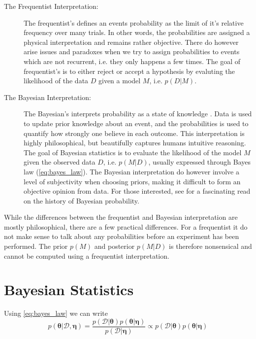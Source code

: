 \begin{description}
    \item[The Frequentist Interpretation:] The frequentist's defines an events probability as the limit of it's relative frequency over many trials. In other words, the probabilities are assigned a physical interpretation and remains rather objective. There do however arise issues and paradoxes when we try to assign probabilities to events which are not recurrent, i.e. they only happens a few times. The goal of frequentist's is to either reject or accept a hypothesis by evaluting the likelihood of the data $D$ given a model $M$, i.e. $p(D | M)$. 
    \item[The Bayesian Interpretation:] The Bayesian's interprets probability as a state of knowledge \cite{Jaynes86bayesianmethods:}. Data is used to update prior knowledge about an event, and the probabilities is used to quantify how strongly one believe in each outcome. This interpretation is highly philosophical, but beautifully captures humans intuitive reasoning. The goal of Bayesian statistics is to evaluate the likelihood of the model $M$ given the observed data $D$, i.e. $p(M | D)$, usually expressed through Bayes law (\cref{eq:bayes_law}). The Bayesian interpretation do however involve a level of subjectivity when choosing priors, making it difficult to form an objective opinion from data. For those interested, see \Cite{Jaynes86bayesianmethods:} for a fascinating read on the history of Bayesian probability.
\end{description}

While the differences between the frequentist and Bayesian interpretation are mostly philosophical, there are a few practical differences. For a frequentist it do not make sense to talk about any probabilities before an experiment has been performed. The prior $p(M)$ and posterior $p(M | D)$ is therefore nonsensical and cannot be computed using a frequentist interpretation.     





\section{Bayesian Statistics}

Using \cref{eq:bayes_law} we can write 
\begin{equation}\label{eq:bayes_learning}
    p(\boldsymbol{\theta}| \mathcal{D}, \boldsymbol{\eta}) = \frac{p(\mathcal{D} | \boldsymbol{\theta}) p(\boldsymbol{\theta} | \boldsymbol{\eta})}{p(\mathcal{D} | \boldsymbol{\eta})} \propto p(\mathcal{D} | \boldsymbol{\theta})p(\boldsymbol{\theta} | \boldsymbol{\eta})
\end{equation}

